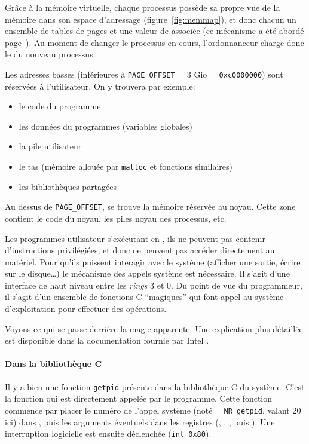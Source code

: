 Grâce à la mémoire virtuelle, chaque processus possède sa propre vue de la
mémoire dans son espace d'adressage (figure~\ref{fig:memmap}), et donc chacun un
ensemble de tables de pages et une valeur de \crtrois{} associée (ce mécanisme a
été abordé page~\pageref{page:mem-virt}). Au moment de changer le processus en
cours, l'ordonnanceur charge donc le \crtrois{} du nouveau processus.

Les adresses basses (inférieures à \texttt{PAGE\_OFFSET} = 3 Gio =
\texttt{0xc0000000}) sont réservées à l'utilisateur. On y trouvera par exemple:

\begin{itemize}
\item le code du programme
\item les données du programmes (variables globales)
\item la pile utilisateur
\item le tas (mémoire allouée par \texttt{malloc} et fonctions similaires)
\item les bibliothèques partagées
\end{itemize}

Au dessus de \texttt{PAGE\_OFFSET}, se trouve la mémoire réservée au noyau.
Cette zone contient le code du noyau, les piles noyau des processus, etc.

\label{sec:impl-syscall}

Les programmes utilisateur s'exécutant en , ils ne peuvent pas contenir
d'instructions privilégiées, et donc ne peuvent pas accéder directement au
matériel. Pour qu'ils puissent interagir avec le système (afficher une sortie,
écrire sur le disque…) le mécanisme des appels système est nécessaire. Il s'agit
d'une interface de haut niveau entre les \emph{rings} 3 et 0. Du point de vue du
programmeur, il s'agit d'un ensemble de fonctions C ``magiques'' qui font appel
au système d'exploitation pour effectuer des opérations.

Voyons ce qui se passe derrière la magie apparente. Une explication plus
détaillée est disponible dans la documentation fournie par Intel
\cite{intelsys}.

\paragraph{Dans la bibliothèque C}

Il y a bien une fonction \texttt{getpid} présente dans la bibliothèque C du
système. C'est la fonction qui est directement appelée par le programme. Cette
fonction commence par placer le numéro de l'appel système (noté
\texttt{\_\_NR\_getpid}, valant 20 ici) dans \eax, puis les arguments éventuels
dans les registres (\ebx, \ecx, \edx, \esi{} puis \edi). Une interruption
logicielle est ensuite déclenchée (\verb!int 0x80!).

